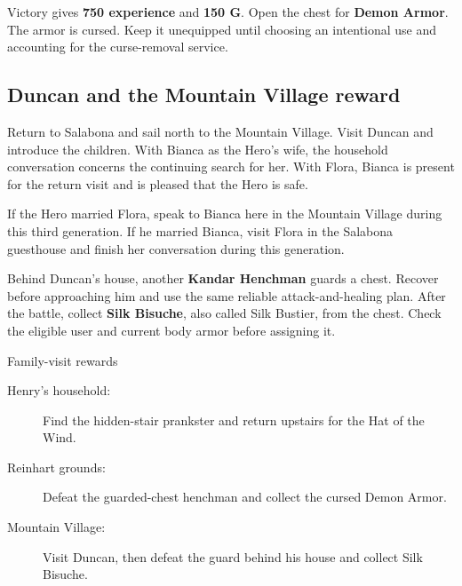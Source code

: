 Victory gives \textbf{750 experience} and \textbf{150 G}.
Open the chest for \textbf{Demon Armor}. The armor is cursed.
Keep it unequipped until choosing an intentional use and accounting
for the curse-removal service.

\subsection*{Duncan and the Mountain Village reward}

Return to Salabona and sail north to the Mountain Village.
Visit Duncan and introduce the children. With Bianca as the Hero's
wife, the household conversation concerns the continuing search
for her. With Flora, Bianca is present for the return visit and
is pleased that the Hero is safe.

If the Hero married Flora, speak to Bianca here in the Mountain
Village during this third generation. If he married Bianca, visit
Flora in the Salabona guesthouse and finish her conversation during
this generation.


Behind Duncan's house, another \textbf{Kandar Henchman} guards
a chest. Recover before approaching him and use the same reliable
attack-and-healing plan. After the battle, collect
\textbf{Silk Bisuche}, also called Silk Bustier, from the chest.
Check the eligible user and current body armor before assigning it.


\begin{routecheck}{Family-visit rewards}
\begin{description}
  \item[Henry's household:] Find the hidden-stair prankster and
    return upstairs for the Hat of the Wind.
  \item[Reinhart grounds:] Defeat the guarded-chest henchman and
    collect the cursed Demon Armor.
  \item[Mountain Village:] Visit Duncan, then defeat the guard behind
    his house and collect Silk Bisuche.
\end{description}
\end{routecheck}

